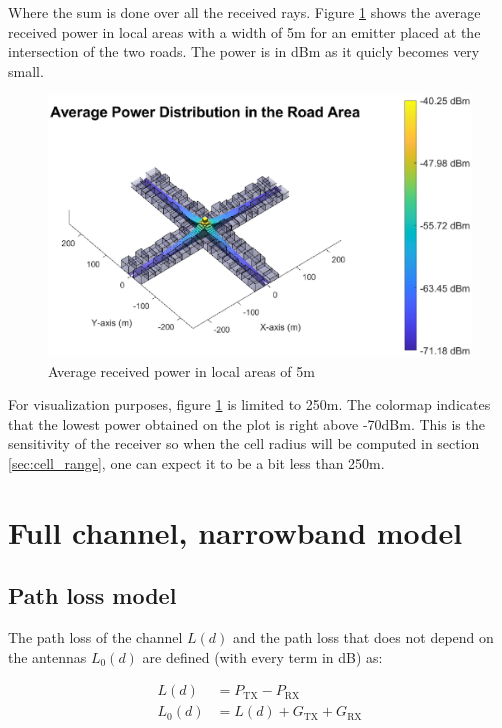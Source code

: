 \documentclass[10pt,a4paper]{ULBreport}
\begin{document}
Where the sum is done over all the received rays. Figure \ref{fig:average_power} shows the average received power in local areas with a width of 5m for an emitter placed at the intersection of the two roads. The power is in dBm as it quicly becomes very small. \\

\begin{figure}[H]
    \centering
    \includegraphics[width=1\textwidth]{3_5.eps}
    \caption{Average received power in local areas of 5m}
    \label{fig:average_power}
\end{figure}

For visualization purposes, figure \ref{fig:average_power} is limited to 250m. The colormap indicates that the lowest power obtained on the plot is right above -70dBm. This is the sensitivity of the receiver so when the cell radius will be computed in section \ref{sec:cell_range}, one can expect it to be a bit less than 250m.\\

\section{Full channel, narrowband model}

\subsection{Path loss model}
The path loss of the channel $L(d)$ and the path loss that does not depend on the antennas $L_0(d)$ are defined (with every term in dB) as:


\begin{subequations}
    \label{eq:path_loss}
    \begin{align}
        L(d) &= P_{\text{TX}} - P_{\text{RX}}\\
        L_0(d) &= L(d) + G_{\text{TX}} + G_{\text{RX}}
    \end{align}
\end{subequations}
\end{document}
